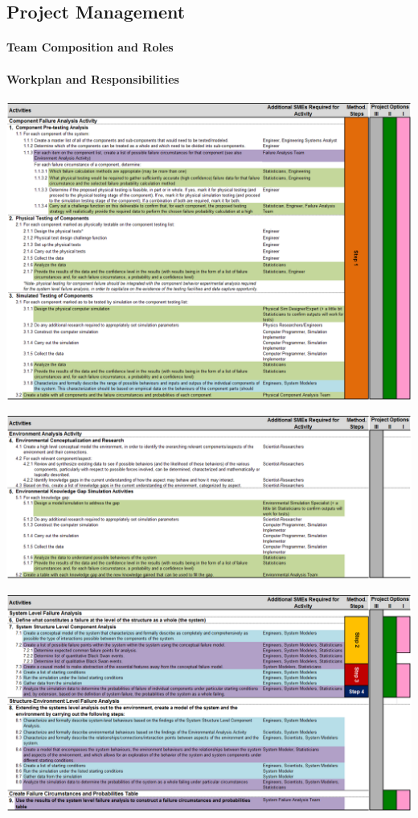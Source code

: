 \subsection{Project Management}
\paragraph{Team Composition and Roles}
\paragraph{Workplan and Responsibilities}
\begin{landscape}\begin{center}
    \includegraphics[height=\textheight]{documents/Tasks_1}
\end{center}
\end{landscape}
\begin{center}
    \includegraphics[width=\textwidth]{documents/Tasks_2}
\end{center}
\begin{center}
    \includegraphics[width=\textwidth]{documents/Tasks_3}
\end{center}
